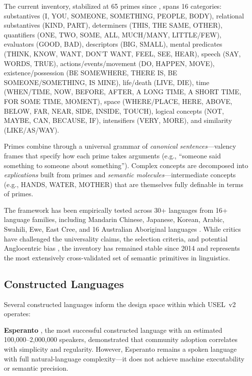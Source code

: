 \documentclass[11pt,a4paper]{article}
\begin{document}
The current inventory, stabilized at 65 primes since \citet{goddard2014words}, spans 16 categories: substantives (I, YOU, SOMEONE, SOMETHING, PEOPLE, BODY), relational substantives (KIND, PART), determiners (THIS, THE SAME, OTHER), quantifiers (ONE, TWO, SOME, ALL, MUCH/MANY, LITTLE/FEW), evaluators (GOOD, BAD), descriptors (BIG, SMALL), mental predicates (THINK, KNOW, WANT, DON'T WANT, FEEL, SEE, HEAR), speech (SAY, WORDS, TRUE), actions/events/movement (DO, HAPPEN, MOVE), existence/possession (BE SOMEWHERE, THERE IS, BE SOMEONE/SOMETHING, IS MINE), life/death (LIVE, DIE), time (WHEN/TIME, NOW, BEFORE, AFTER, A LONG TIME, A SHORT TIME, FOR SOME TIME, MOMENT), space (WHERE/PLACE, HERE, ABOVE, BELOW, FAR, NEAR, SIDE, INSIDE, TOUCH), logical concepts (NOT, MAYBE, CAN, BECAUSE, IF), intensifiers (VERY, MORE), and similarity (LIKE/AS/WAY).

Primes combine through a universal grammar of \emph{canonical sentences}---valency frames that specify how each prime takes arguments (e.g., ``someone said something to someone about something''). Complex concepts are decomposed into \emph{explications} built from primes and \emph{semantic molecules}---intermediate concepts (e.g., HANDS, WATER, MOTHER) that are themselves fully definable in terms of primes.

The framework has been empirically tested across 30+ languages from 16+ language families, including Mandarin Chinese, Japanese, Korean, Arabic, Swahili, Ewe, East Cree, and 16 Australian Aboriginal languages \citep{goddard2008cross, levisen2017cultural}. While critics have challenged the universality claims, the selection criteria, and potential Anglocentric bias \citep{matthewson2003survey, levinson2003space}, the inventory has remained stable since 2014 and represents the most extensively cross-validated set of semantic primitives in linguistics.

\subsection{Constructed Languages}
\label{sec:conlangs}

Several constructed languages inform the design space within which USEL~v2 operates:

\textbf{Esperanto} \citep{zamenhof1887lingvo}, the most successful constructed language with an estimated 100,000--2,000,000 speakers, demonstrated that community adoption correlates with simplicity and regularity. However, Esperanto remains a spoken language with full natural-language complexity---it does not achieve machine executability or semantic precision.
\end{document}
